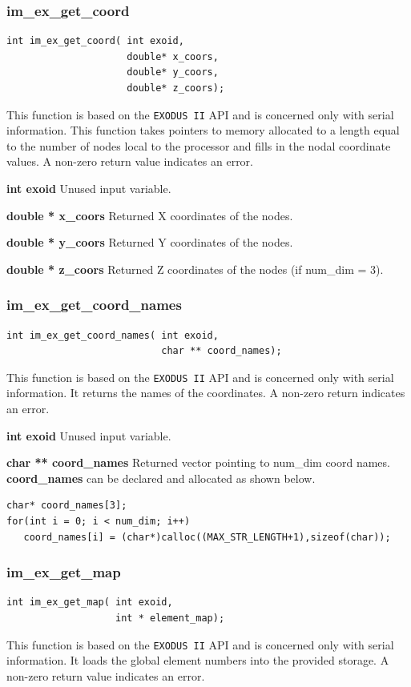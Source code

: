 \subsubsection{im\_ex\_get\_coord}
{\ttfamily  \begin{verbatim}
int im_ex_get_coord( int exoid,
                     double* x_coors,
                     double* y_coors,
                     double* z_coors);
\end{verbatim}}
This function is based on the \texttt{EXODUS II} API and is concerned only with serial information. This function takes pointers to memory allocated to a length equal to the number of nodes local to the processor and fills in the nodal coordinate values. A non-zero return value indicates an error.

{\setlength{\parindent}{0pt}
 \textbf{int exoid} Unused input variable.}

{\setlength{\parindent}{0pt}
 \textbf{double * x\_coors} Returned X coordinates of the nodes.}

{\setlength{\parindent}{0pt}
 \textbf{double * y\_coors} Returned Y coordinates of the nodes.}

{\setlength{\parindent}{0pt}
 \textbf{double * z\_coors} Returned Z coordinates of the nodes (if num\_dim = 3).}


\subsubsection{im\_ex\_get\_coord\_names}
{\ttfamily  \begin{verbatim}
int im_ex_get_coord_names( int exoid,
                           char ** coord_names);
\end{verbatim}}
This function is based on the \texttt{EXODUS II} API and is concerned only with serial information. It returns the names of the coordinates. A non-zero return indicates an error.

{\setlength{\parindent}{0pt}
 \textbf{int exoid} Unused input variable.}

{\setlength{\parindent}{0pt}
 \textbf{char ** coord\_names} Returned vector pointing to num\_dim coord names. \textbf{coord\_names} can be declared and allocated as shown below.}
{\ttfamily  \begin{verbatim}
char* coord_names[3];
for(int i = 0; i < num_dim; i++)
   coord_names[i] = (char*)calloc((MAX_STR_LENGTH+1),sizeof(char));
\end{verbatim}}

\subsubsection{im\_ex\_get\_map}
{\ttfamily  \begin{verbatim}
int im_ex_get_map( int exoid,
                   int * element_map);
\end{verbatim}}
This function is based on the \texttt{EXODUS II} API and is concerned only with serial information. It loads the global element numbers into the provided storage. A non-zero return value indicates an error.

